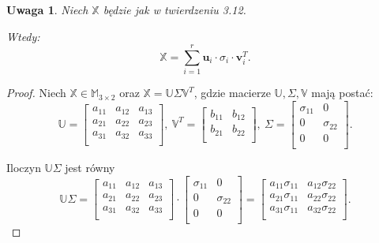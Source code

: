 \documentclass[12pt,a4paper]{report}
\newtheorem{uwaga}[df]{Uwaga}
\begin{document}
\begin{uwaga}
Niech $\mathbb{X}$ będzie jak w twierdzeniu 3.12.

Wtedy:
$$
\mathbb{X} = \sum_{i=1}^r \mathbf{u}_i \cdot\sigma_i \cdot \mathbf{v}_i^T.
$$
\end{uwaga}
\begin{proof}
Niech $\mathbb{X} \in \mathbb{M}_{3\times 2}$ oraz $\mathbb{X}=\mathbb{U} \Sigma \mathbb{V}^T$, gdzie macierze $\mathbb{U}, \Sigma, \mathbb{V}$ mają postać:
$$
\mathbb{U} = \left[
        \begin{array}{ccc}
         a_{11} & a_{12} & a_{13} \\
         a_{21} & a_{22} & a_{23} \\
         a_{31} & a_{32} & a_{33} \\
         \end{array}
      \right], \: \mathbb{V}^T = \left[
        \begin{array}{cc}
         b_{11} & b_{12}  \\
         b_{21} & b_{22}  \\
         \end{array}
      \right], \: \Sigma = \left[
        \begin{array}{cc}
         \sigma_{11} & 0 \\
         0 & \sigma_{22} \\
         0 & 0 \\
         \end{array}
      \right].$$
      
Iloczyn $\mathbb{U} \Sigma$ jest równy
$$\mathbb{U} \Sigma = \left[
        \begin{array}{ccc}
         a_{11} & a_{12} & a_{13} \\
         a_{21} & a_{22} & a_{23} \\
         a_{31} & a_{32} & a_{33} \\
         \end{array}
      \right] \cdot \left[
        \begin{array}{cc}
         \sigma_{11} & 0 \\
         0 & \sigma_{22} \\
         0 & 0 \\
         \end{array}
      \right] = \left[
        \begin{array}{cc}
         a_{11} \sigma_{11} & a_{12} \sigma_{22}\\
         a_{21} \sigma_{11} & a_{22} \sigma_{22} \\
         a_{31} \sigma_{11} & a_{32} \sigma_{22} \\
         \end{array}
      \right].$$
      

\end{proof}
\end{document}
